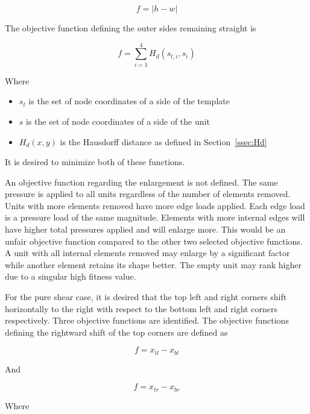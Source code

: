 \begin{equation}
	f=\left | h-w \right |
\end{equation}

The objective function defining the outer sides remaining straight is

\begin{equation}
	f=\sum_{i=1}^{4}H_{d}\left ( s_{t,i},s_{i} \right )
\end{equation}

Where

\begin{itemize}
	\item $s_{t}$ is the set of node coordinates of a side of the template
	\item $s$ is the set of node coordinates of a side of the unit
	\item $H_{d}\left ( x,y \right )$ is the Hausdorff distance as defined in Section~\ref{ssec:Hd}
\end{itemize}

It is desired to minimize both of these functions.

An objective function regarding the enlargement is not defined. The same pressure is applied to all units regardless of the number of elements removed. Units with more elements removed have more edge loads applied. Each edge load is a pressure load of the same magnitude. Elements with more internal edges will have higher total pressures applied and will enlarge more. This would be an unfair objective function compared to the other two selected objective functions. A unit with all internal elements removed may enlarge by a significant factor while another element retains its shape better. The empty unit may rank higher due to a singular high fitness value.

For the pure shear case, it is desired that the top left and right corners shift horizontally to the right with respect to the bottom left and right corners respectively. Three objective functions are identified. The objective functions defining the rightward shift of the top corners are defined as

\begin{equation}
	f=x_{tl}-x_{bl}
\end{equation}

And

\begin{equation}
	f=x_{tr}-x_{br}
\end{equation}

Where

